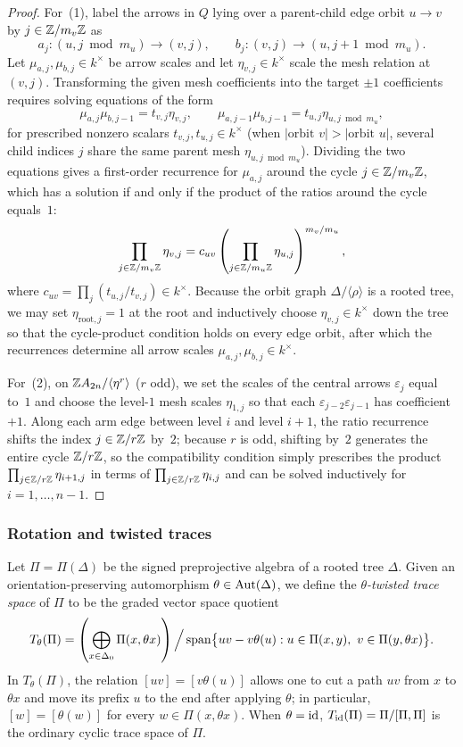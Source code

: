 \begin{proof}
For~(1), label the arrows in $Q$ lying over a parent-child edge orbit $u\to v$ by $j\in\mathbb Z/m_v\mathbb Z$ as
\[
  a_j\colon(u,j\bmod m_u)\to(v,j),\qquad
  b_j\colon(v,j)\to(u,j+1\bmod m_u).
\]
Let $\mu_{a,j},\mu_{b,j}\in k^\times$ be arrow scales and let $\eta_{v,j}\in k^\times$ scale the mesh relation at $(v,j)$. Transforming the given mesh coefficients into the target $\pm1$ coefficients requires solving equations of the form
\[
  \mu_{a,j}\mu_{b,j-1}=t_{v,j}\eta_{v,j},\qquad
  \mu_{a,j-1}\mu_{b,j-1}=t_{u,j}\eta_{u,j\bmod m_u},
\]
for prescribed nonzero scalars $t_{v,j},t_{u,j}\in k^\times$ (when $|\text{orbit }v|>|\text{orbit }u|$, several child indices $j$ share the same parent mesh $\eta_{u,j\bmod m_u}$). Dividing the two equations gives a first-order recurrence for $\mu_{a,j}$ around the cycle $j\in\mathbb Z/m_v\mathbb Z$, which has a solution if and only if the product of the ratios around the cycle equals~$1$:
\[
  \prod_{j\in\mathbb Z/m_v\mathbb Z}\eta_{v,j}=c_{uv}\left(\prod_{j\in\mathbb Z/m_u\mathbb Z}\eta_{u,j}\right)^{m_v/m_u},
\]
where $c_{uv}=\prod_{j}(t_{u,j}/t_{v,j})\in k^\times$. Because the orbit graph $\Delta/\langle\rho\rangle$ is a rooted tree, we may set $\eta_{\text{root},j}=1$ at the root and inductively choose $\eta_{v,j}\in k^\times$ down the tree so that the cycle-product condition holds on every edge orbit, after which the recurrences determine all arrow scales $\mu_{a,j},\mu_{b,j}\in k^\times$.

For~(2), on $\mathbb Z A_{2n}/\langle\eta^r\rangle$ ($r$ odd), we set the scales of the central arrows $\varepsilon_j$ equal to~$1$ and choose the level-$1$ mesh scales $\eta_{1,j}$ so that each $\varepsilon_{j-2}\varepsilon_{j-1}$ has coefficient $+1$. Along each arm edge between level $i$ and level $i+1$, the ratio recurrence shifts the index $j\in\mathbb Z/r\mathbb Z$ by~$2$; because $r$ is odd, shifting by~$2$ generates the entire cycle $\mathbb Z/r\mathbb Z$, so the compatibility condition simply prescribes the product $\prod_{j\in\mathbb Z/r\mathbb Z}\eta_{i+1,j}$ in terms of $\prod_{j\in\mathbb Z/r\mathbb Z}\eta_{i,j}$ and can be solved inductively for $i=1,\ldots,n-1$.
\end{proof}

\subsubsection{Rotation and twisted traces}

Let $\Pi=\Pi(\Delta)$ be the signed preprojective algebra of a rooted tree $\Delta$. Given an orientation-preserving automorphism $\theta\in\operatorname{Aut}(\Delta)$, we define the \emph{$\theta$-twisted trace space} of $\Pi$ to be the graded vector space quotient
\begin{equation}
  T_\theta(\Pi)=\left(\bigoplus_{x\in\Delta_0}\Pi(x,\theta x)\right)
  \Big/\operatorname{span}\bigl\{uv-v\theta(u):u\in\Pi(x,y),\ v\in\Pi(y,\theta x)\bigr\}.
  \label{eq:twisted-trace-space}
\end{equation}
In $T_\theta(\Pi)$, the relation $[uv]=[v\theta(u)]$ allows one to cut a path $uv$ from $x$ to $\theta x$ and move its prefix $u$ to the end after applying $\theta$; in particular, $[w]=[\theta(w)]$ for every $w\in\Pi(x,\theta x)$. When $\theta=\operatorname{id}$, $T_{\operatorname{id}}(\Pi)=\Pi/[\Pi,\Pi]$ is the ordinary cyclic trace space of $\Pi$.

